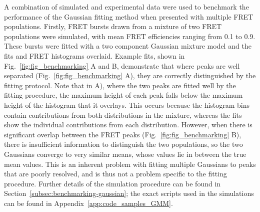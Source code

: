 A combination of simulated and experimental data were used to benchmark the performance of the Gaussian fitting method when presented with multiple FRET populations. Firstly, FRET bursts drawn from a mixture of two FRET populations were simulated, with mean FRET efficiencies ranging from 0.1 to 0.9. These bursts were fitted with a two component Gaussian mixture model and the fits and FRET histograms overlaid. Example fits, shown in Fig.~\ref{fig:fig_benchmarking} A and B, demonstrate that where peaks are well separated (Fig.~\ref{fig:fig_benchmarking} A), they are correctly distinguished by the fitting protocol. Note that in A), where the two peaks are fitted well by the fitting procedure, the maximum height of each peak falls below the maximum height of the histogram that it overlays. This occurs because the histogram bins contain contributions from both distributions in the mixture, whereas the fits show the individual contributions from each distribution. However, when there is significant overlap between the FRET peaks (Fig.~\ref{fig:fig_benchmarking} B), there is insufficient information to distinguish the two populations, so the two Gaussians converge to very similar means, whose values lie in between the true mean values. This is an inherent problem with fitting multiple Gaussians to peaks that are poorly resolved, and is thus not a problem specific to the fitting procedure. Further details of the simulation procedure can be found in Section~\ref{subsec:benchmarking-gaussian}; the exact scripts used in the simulations can be found in Appendix~\ref{app:code_samples_GMM}.

